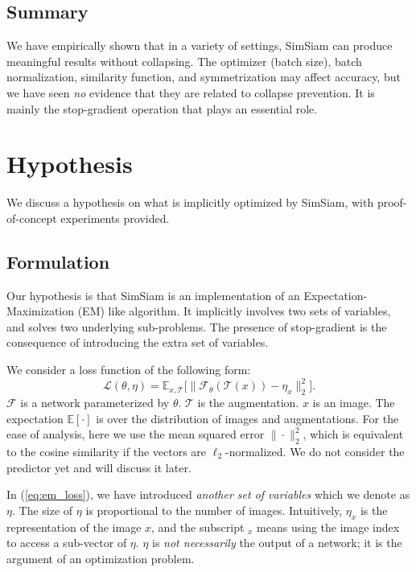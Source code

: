 \documentclass[final]{cvpr}
\begin{document}
\subsection{Summary}

We have empirically shown that in a variety of settings, SimSiam can produce meaningful results without collapsing. The optimizer (batch size), batch normalization, similarity function, and symmetrization may affect accuracy, but we have seen \emph{no} evidence that they are related to collapse prevention. It is mainly the stop-gradient operation that plays an essential role.

\section{Hypothesis} \label{sec:hypo}

We discuss a hypothesis on what is implicitly optimized by SimSiam, with proof-of-concept experiments provided.

\subsection{Formulation}

Our hypothesis is that SimSiam is an implementation of an Expectation-Maximization (EM) like algorithm. It implicitly involves two sets of variables, and solves two underlying sub-problems. The presence of stop-gradient is the consequence of introducing the extra set of variables.

We consider a loss function of the following form:
\begin{equation}
\mathcal{L}(\theta, \eta)=
\mathbb{E}_{x, \mathcal{T}}
\Big[
	\big\|
	\mathcal{F}_\theta(\mathcal{T}(x)) - \eta_{x} 
	\big\|_2^2
\Big].
\label{eq:em_loss}
\end{equation}
$\mathcal{F}$ is a network parameterized by $\theta$.
$\mathcal{T}$ is the augmentation.
$x$ is an image.
The expectation $\mathbb{E}[\cdot]$ is over the distribution of images and augmentations.
For the ease of analysis, here we use the mean squared error $\|\cdot\|^2_2$, which is equivalent to the cosine similarity if the vectors are $\ell_2$-normalized.
We do not consider the predictor yet and will discuss it later.

In (\ref{eq:em_loss}), we have introduced \emph{another set of variables} which we denote as $\eta$.
The size of $\eta$ is proportional to the number of images.
Intuitively, $\eta_x$ is the representation of the image $x$, and the subscript $_x$ means using the image index to access a sub-vector of $\eta$. 
$\eta$ is \emph{not necessarily} the output of a network; it is the argument of an optimization problem.
\end{document}
